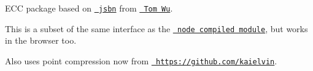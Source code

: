 ECC package based on \href{https://github.com/andyperlitch/jsbn}{\texttt{ jsbn}} from \href{http://www-cs-students.stanford.edu/~tjw/}{\texttt{ Tom Wu}}.

This is a subset of the same interface as the \href{https://github.com/quartzjer/ecc}{\texttt{ node compiled module}}, but works in the browser too.

Also uses point compression now from \href{https://github.com/kaielvin/jsbn-ec-point-compression}{\texttt{ https\+://github.\+com/kaielvin}}. 